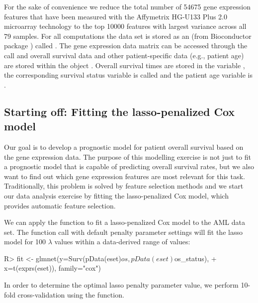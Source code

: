 \documentclass[]{jss}
\begin{document}
For the sake of convenience we reduce the total number of 54675 gene expression features that have been measured with the Affymetrix HG-U133 Plus 2.0 microarray technology to the top 10000 features with largest variance across all 79 samples. For all computations the data set is stored as an  (from Bioconductor package  \citep{Bioconductor}) called . The gene expression data matrix can be accessed through the call  and overall survival data and other patient-specific data (e.g., patient age) are stored within the  object . Overall survival times are stored in the variable , the corresponding survival status variable is called  and the patient age variable is .

\subsection{Starting off: Fitting the lasso-penalized Cox model} 
Our goal is to develop a prognostic model for patient overall survival based on the gene expression data. The purpose of this modelling exercise is not just to fit a prognostic model that is capable of predicting overall survival rates, but we also want to find out which gene expression features are most relevant for this task. Traditionally, this problem is solved by feature selection methods and we start our data analysis exercise by fitting the lasso-penalized Cox model, which provides automatic feature selection.

We can apply the  function to fit a lasso-penalized Cox model to the AML data set. The function call with default penalty parameter settings will fit the lasso model for 100 $\lambda$ values within a data-derived range of values:
\begin{Schunk}
\begin{Sinput}
R> fit <- glmnet(y=Surv(pData(eset)$os, pData(eset)$os_status), 
+                x=t(exprs(eset)), family="cox")
\end{Sinput}
\end{Schunk}
 
In order to determine the optimal lasso penalty parameter value, we perform 10-fold cross-validation using the  function.
\end{document}
